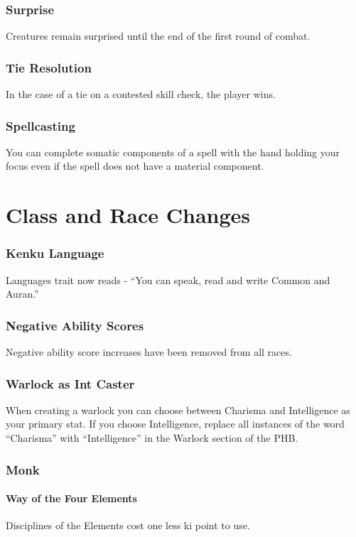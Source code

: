 \documentclass[10pt,twoside,twocolumn,nomultitoc,openany,nodeprecatedcode]{dndbook}
\begin{document}
	\subsection{Surprise}
	Creatures remain surprised until the end of the first round of combat.
	
	\subsection{Tie Resolution}
	In the case of a tie on a contested skill check, the player wins.
	
	\subsection{Spellcasting}
	You can complete somatic components of a spell with the hand holding your focus even if the spell does not have a material component. 
	
	\chapter{Class and Race Changes}
	\vspace{1em}
	\subsection{Kenku Language}
	Languages trait now reads - “You can speak, read and write Common and Auran.”
	
	\subsection{Negative Ability Scores}
	Negative ability score increases have been removed from all races.
	
	\subsection{Warlock as Int Caster}
	When creating a warlock you can choose between Charisma and Intelligence as your primary stat. If you choose Intelligence, replace all instances of the word “Charisma” with “Intelligence” in the Warlock section of the PHB.
	
	\subsection{Monk}
	\subsubsection{Way of the Four Elements}
	Disciplines of the Elements cost one less ki point to use. 
\end{document}
